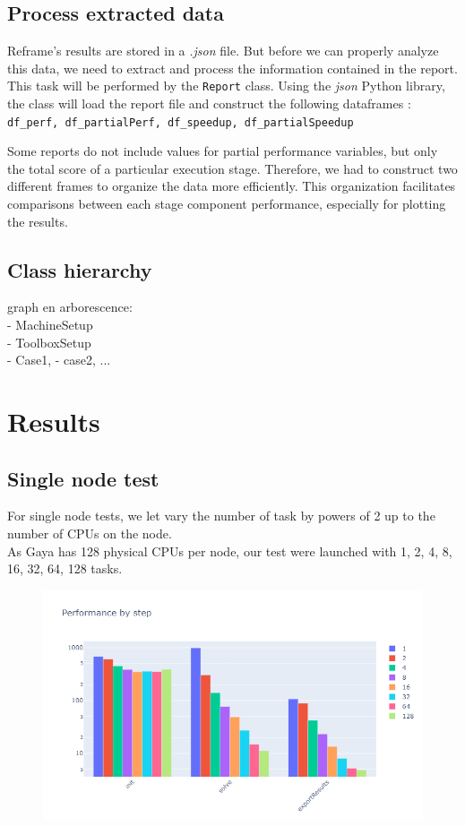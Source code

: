 \documentclass[12pt]{article}
\begin{document}
\subsection{Process extracted data}
Reframe's results are stored in a \textit{.json} file. But before we can properly analyze this data, we need to extract and process the information contained in the report.
This task will be performed by the \small{\texttt{Report}} class. Using the \textit{json} Python library, the class will load the report file and construct the following dataframes :
\texttt{df\_perf, df\_partialPerf, df\_speedup, df\_partialSpeedup}

Some reports do not include values for partial performance variables, but only the total score of a particular execution stage.
Therefore, we had to construct two different frames to organize the data more efficiently.
This organization facilitates comparisons between each stage component performance, especially for plotting the results.

\subsection{Class hierarchy}
graph en arborescence:\\
- MachineSetup \\
- ToolboxSetup \\
- Case1,   - case2,  ...
\section{Results}

\subsection{Single node test}
For single node tests, we let vary the number of task by powers of 2 up to the number of CPUs on the node. \\
As Gaya has 128 physical CPUs per node, our test were launched with 1, 2, 4, 8, 16, 32, 64, 128 tasks.

\begin{figure}[H]
    \centering
    \includegraphics[width=\textwidth]{../illustrations/gayaByStep.png}
\end{figure}
\end{document}
